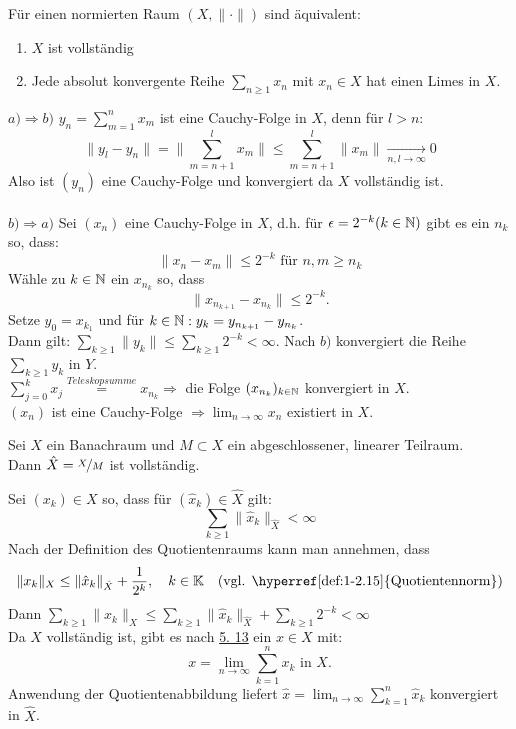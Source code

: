 \begin{lemma} \label{lemma:5.13}
	Für einen normierten Raum $(X, \| \cdot \|)$ sind äquivalent:
	\begin{enumerate}[label=\alph*\upshape)]
		\item $X$ ist vollständig
		\item Jede absolut konvergente Reihe $\sum_{n \geq 1} x_{n}$ mit $x_{n} \in X$ hat einen Limes in $X$.
	\end{enumerate}	
\end{lemma}

\begin{beweis}
	$a) \Rightarrow b)$	$y_{n} = \sum_{m = 1}^{n} x_{m}$ ist eine Cauchy-Folge in $X$, denn für $l > n$:
		\[ \| y_{l} - y_{n} \| = \| \sum_{m = n + 1}^{l} x_{m} \| \leq \sum_{m = n + 1}^{l} \| x_{m} \| \xrightarrow[n, l \rightarrow \infty]{} 0 \]
	Also ist $(y_{n})$ eine Cauchy-Folge und konvergiert da $X$ vollständig ist. \\ \\
	$b) \Rightarrow a)$	Sei $(x_{n})$ eine Cauchy-Folge in $X$, d.h. für $\epsilon = 2^{-k} (k \in \mathbb{N})$ gibt es ein $n_{k}$ so, dass:
		\[ \| x_{n} - x_{m} \| \leq 2^{-k} \text{ für } n, m \geq n_{k} \]
		Wähle zu $k \in \mathbb{N}$ ein $x_{n_{k}}$ so, dass
		\[ \| x_{n_{k+1}} - x_{n_{k}} \| \leq 2^{-k}.\]
		Setze $y_{0} = x_{k_{1}}$ und für $k \in \mathbb{N}: y_{k} = y_{n_{k+1}} - y_{n_{k}}$. \\
		Dann gilt: $\sum_{k \geq 1} \| y_{k} \| \leq \sum_{k \geq 1} 2^{-k} < \infty$. Nach $b)$ konvergiert die Reihe $\sum_{k \geq 1} y_{k}$ in $Y$. \\
		$\sum_{j = 0}^{k} x_{j} \overset{Teleskopsumme}{=} x_{n_{k}} \Rightarrow $ die Folge $(x_{n_{k}})_{k \in \mathbb{N}}$ konvergiert in $X$. \\
		$(x_{n})$ ist eine Cauchy-Folge $\Rightarrow \lim_{n \rightarrow \infty} x_{n}$ existiert in $X$.
\end{beweis}


\begin{kor}
	Sei $X$ ein Banachraum und $M \subset X$ ein abgeschlossener, linearer Teilraum. \\
	Dann $\hat X = \nicefrac{X}{M}$ ist vollständig.
	\begin{beweis}	
		Sei $(x_{k}) \in X$ so, dass für $(\hat x_{k}) \in \hat X$ gilt:
		\[ \sum_{k \geq 1} \| \hat x_{k} \|_{\hat X} < \infty \]
		Nach der Definition des Quotientenraums kann man annehmen, dass
		\[ \| x_{k} \|_{X} \leq \| \hat x_{k} \|_{\hat X} + \frac{1}{2^{k}}, \quad k \in \MdK \quad \text{(vgl. \hyperref[def:1-2.15]{Quotientennorm})} \]
		Dann $\sum_{k \geq 1} \| x_{k} \|_{X} \leq \sum_{k \geq 1} \| \hat x_{k} \|_{\hat X} + \sum_{k \geq 1} 2^{-k} < \infty$ \\
		Da $X$ vollständig ist, gibt es nach \hyperref[lemma:1-5.13]{5. 13} ein $x \in X$ mit:
			\[ x = \lim_{n \rightarrow \infty} \sum_{k = 1}^{n} x_{k} \text{ in } X. \]
		Anwendung der Quotientenabbildung liefert $\hat x = \lim_{n \rightarrow \infty} \sum_{k = 1}^{n} \hat x_{k}$ konvergiert in $\hat X$.
	\end{beweis}
\end{kor}


